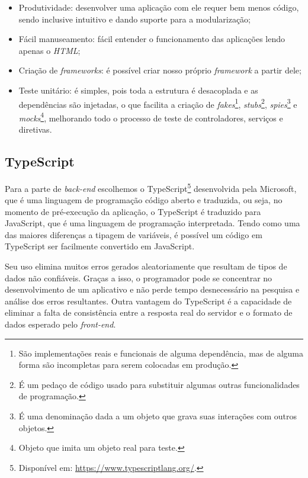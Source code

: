 \begin{itemize}
    \item Produtividade: desenvolver uma aplicação com ele requer bem menos código, sendo inclusive intuitivo e dando suporte para a modularização; 
    \item Fácil manuseamento: fácil entender o funcionamento das aplicações lendo apenas o \textit{HTML};   
    \item Criação de \textit{frameworks}: é possível criar nosso próprio \textit{framework} a partir dele;   
    \item Teste unitário: é simples, pois toda a estrutura é desacoplada e as dependências são injetadas, o que facilita a criação de \textit{fakes}\footnote{São implementações reais e funcionais de alguma dependência, mas de alguma forma são incompletas para serem colocadas em produção.}, \textit{stubs}\footnote{É um pedaço de código usado para substituir algumas outras funcionalidades de programação.}, \textit{spies}\footnote{É uma denominação dada a um objeto que grava suas interações com outros objetos.} e \textit{mocks}\footnote{Objeto que imita um objeto real para teste.}, melhorando todo o processo de teste de controladores, serviços e diretivas. 
\end{itemize}

\subsection{TypeScript}
\label{ssec:TypeScript}
Para a parte de \textit{back-end} escolhemos o TypeScript\footnote{Disponível em: \url{https://www.typescriptlang.org/}.} desenvolvida pela Microsoft, que é uma linguagem de programação código aberto e traduzida, ou seja, no momento de pré-execução da aplicação, o TypeScript é traduzido para JavaScript, que é uma linguagem de programação interpretada. Tendo como uma das maiores diferenças a tipagem de variáveis, é possível um código em TypeScript ser facilmente convertido em JavaScript. 

Seu uso elimina muitos erros gerados aleatoriamente que resultam de tipos de dados não confiáveis. Graças a isso, o programador pode se concentrar no desenvolvimento de um aplicativo e não perde tempo desnecessário na pesquisa e análise dos erros resultantes. Outra vantagem do TypeScript é a capacidade de eliminar a falta de consistência entre a resposta real do servidor e o formato de dados esperado pelo \textit{front-end}.\cite{Jakub2019TypeScript}

